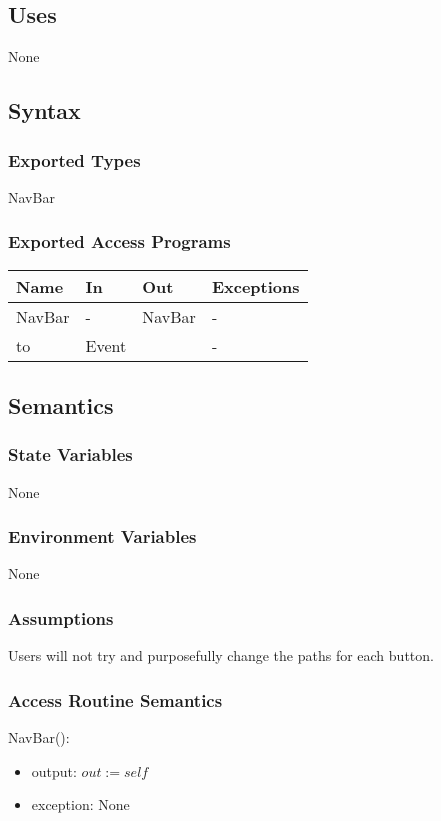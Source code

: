 \documentclass[12pt, titlepage]{article}
\begin{document}
\subsection{Uses}
None
\subsection{Syntax}
\subsubsection{Exported Types}
NavBar
\subsubsection{Exported Access Programs}
\begin{center}
	\begin{tabular}{p{3cm} p{4cm} p{4cm} p{3cm}}
		
		\hline
		\textbf{Name} & \textbf{In} & \textbf{Out} & \textbf{Exceptions} \\
		\hline
		NavBar & - & NavBar & - \\
		to & Event &  & - \\
		\hline
	\end{tabular}
\end{center}
\subsection{Semantics}
\subsubsection{State Variables}
None
\subsubsection{Environment Variables}
None
\subsubsection{Assumptions}
Users will not try and purposefully change the paths for each button.
\subsubsection{Access Routine Semantics}

\noindent NavBar():
\begin{itemize}
	\item output: $out := self$ 
	\item exception: None
\end{itemize}
\end{document}
